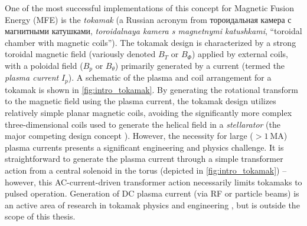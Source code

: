 One of the most successful implementations of this concept for Magnetic Fusion Energy (MFE) is the \emph{tokamak} \cite{Wesson2011} (a Russian acronym from \foreignlanguage{russian}{тороидальная камера с магнитными катушками}, \emph{toroidalnaya kamera s magnetnymi katushkami}, ``toroidal chamber with magnetic coils'').  The tokamak design is characterized by a strong toroidal magnetic field (variously denoted $B_T$ or $B_\Phi$) applied by external coils, with a poloidal field ($B_p$ or $B_\theta$) primarily generated by a current (termed the \emph{plasma current} $I_p$).  A schematic of the plasma and coil arrangement for a tokamak is shown in \cref{fig:intro_tokamak}.  By generating the rotational transform to the magnetic field using the plasma current, the tokamak design utilizes relatively simple planar magnetic coils, avoiding the significantly more complex three-dimensional coils used to generate the helical field in a \emph{stellarator} (the major competing design concept \cite{Meade2010}).  However, 
the necessity for large ($>\SI{1}{\mega\ampere}$) plasma currents presents a significant engineering and physics challenge.  It is straightforward to generate the plasma current through a simple transformer action from a central solenoid in the torus (depicted in \cref{fig:intro_tokamak}) -- however, this AC-current-driven transformer action necessarily limits tokamaks to pulsed operation.  Generation of DC plasma current (via RF or particle beams) is an active area of research in tokamak physics and engineering \cite{Wesson2011}, but is outside the scope of this thesis.


